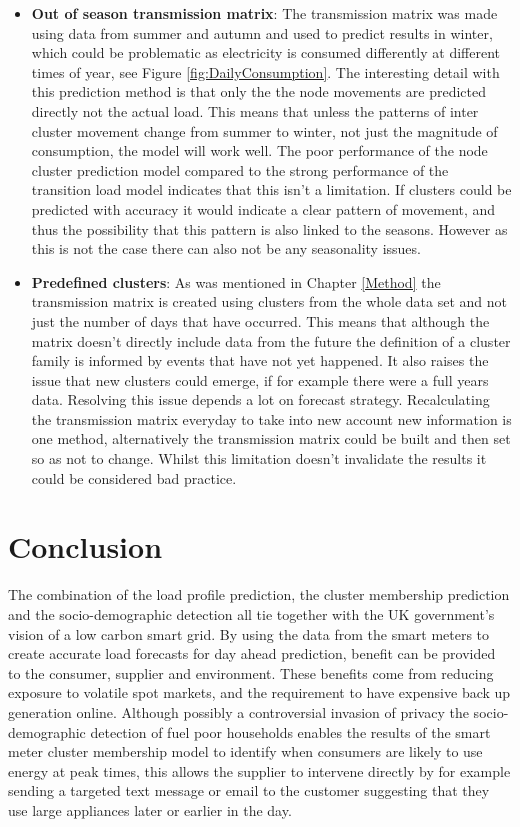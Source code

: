 \begin{itemize}
    \item \textbf{Out of season transmission matrix}: The transmission matrix was made using data from summer and autumn and used to predict results in winter, which could be problematic as electricity is consumed differently at different times of year, see Figure \ref{fig:DailyConsumption}. The interesting detail with this prediction method is that only the the node movements are predicted directly not the actual load. This means that unless the patterns of inter cluster movement change from summer to winter, not just the magnitude of consumption, the model will work well. The poor performance of the node cluster prediction model compared to the strong performance of the transition load model indicates that this isn't a limitation. If clusters could be predicted with accuracy it would indicate a clear pattern of movement, and thus the possibility that this pattern is also linked to the seasons. However as this is not the case there can also not be any seasonality issues.
    
    \item \textbf{Predefined clusters}: As was mentioned in Chapter \ref{Method} the transmission matrix is created using clusters from the whole data set and not just the number of days that have occurred. This means that although the matrix doesn't directly include data from the future the definition of a cluster family is informed by events that have not yet happened. It also raises the issue that new clusters could emerge, if for example there were a full years data. Resolving this issue depends a lot on forecast strategy. Recalculating the transmission matrix everyday to take into new account new information is one method, alternatively the transmission matrix could be built and then set so as not to change. Whilst this limitation doesn't invalidate the results it could be considered bad practice.
    
    \end{itemize}


\section{Conclusion}

The combination of the load profile prediction, the cluster membership prediction and the socio-demographic detection all tie together with the UK government's vision of a low carbon smart grid. By using the data from the smart meters to create accurate load forecasts for day ahead prediction, benefit can be provided to the consumer, supplier and environment. These benefits come from reducing exposure to volatile spot markets, and the requirement to have expensive back up generation online. Although possibly a controversial invasion of privacy the socio-demographic detection of fuel poor households enables the results of the smart meter cluster membership model to identify when consumers are likely to use energy at peak times, this allows the supplier to intervene directly by for example sending a targeted text message or email to the customer suggesting that they use large appliances later or earlier in the day. 

